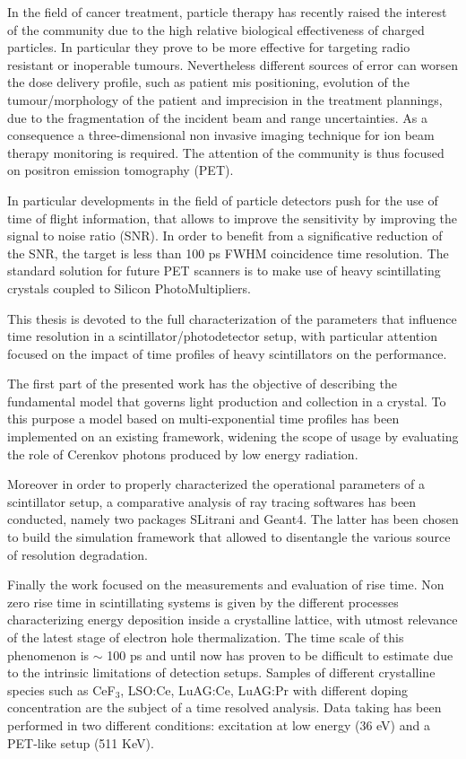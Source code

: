 \abstract

In the field of cancer treatment, particle therapy has recently raised the interest of the community due to the high relative biological effectiveness of charged particles.
In particular they prove to be more effective for targeting radio resistant or inoperable tumours.
Nevertheless different sources of error can worsen the dose delivery profile, such as patient mis positioning, evolution of the tumour/morphology of the patient and imprecision in the treatment plannings, due to the fragmentation of the incident beam and range uncertainties.
As a consequence a three-dimensional non invasive imaging technique for ion beam therapy monitoring is required. The attention of the community is thus focused on positron emission tomography (PET).

In particular developments in the field of particle detectors push for the use of time of flight information, that allows to improve the sensitivity by improving the signal to noise ratio (SNR). 
In order to benefit from a significative reduction of the SNR, the target is less than 100 ps FWHM coincidence time resolution.
The standard solution for future PET scanners is to make use of heavy scintillating crystals coupled to Silicon PhotoMultipliers. 

This thesis is devoted to the full characterization of the parameters that influence time resolution in a scintillator/photodetector setup, with particular attention focused on the impact of time profiles of heavy scintillators on the performance.

The first part of the presented work has the objective of describing the fundamental model that governs light production and collection in a crystal.
To this purpose a model based on multi-exponential time profiles has been implemented on an existing framework, widening the scope of usage by evaluating the role of Cerenkov photons produced by low energy radiation.

Moreover in order to properly characterized the operational parameters of a scintillator setup, a comparative analysis of ray tracing softwares has been conducted, namely two packages SLitrani and Geant4. The latter has been chosen to build the simulation framework that allowed to disentangle the various source of resolution degradation.

Finally the work focused on the measurements and evaluation of rise time. Non zero rise time in scintillating systems is given by the different processes characterizing energy deposition inside a crystalline lattice, with utmost relevance of the latest stage of electron hole thermalization. The time scale of this phenomenon is $\sim$ 100 ps and until now has proven to be difficult to estimate due to the intrinsic limitations of detection setups.
Samples of different crystalline species such as CeF$_{3}$, LSO:Ce, LuAG:Ce, LuAG:Pr with different doping concentration are the subject of a time resolved analysis. 
Data taking has been performed in two different conditions: excitation at low energy (36 eV) and a PET-like setup (511 KeV).

